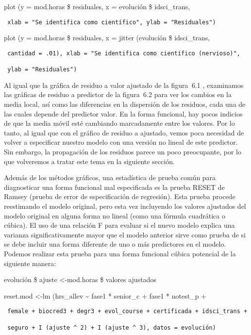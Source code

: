 \documentclass[
]{book}
\begin{document}
plot (y = mod.horas \$ residuales, x = evolución \$ idsci\_trans,

\begin{verbatim}
 xlab = "Se identifica como científico", ylab = "Residuales")
\end{verbatim}

plot (y = mod.horas \$ residuales, x = jitter (evolución \$ idsci\_trans,

\begin{verbatim}
 cantidad = .01), xlab = "Se identifica como científico (nervioso)",

 ylab = "Residuales")
\end{verbatim}

Al igual que la gráfica de residuo a valor ajustado de la figura  6.1 , examinamos las gráficas de residuo a predictor de la figura  6.2 para ver los cambios en la media local, así como las diferencias en la dispersión de los residuos, cada una de las cuales depende del predictor valor. En la forma funcional, hay pocos indicios de que la media móvil esté cambiando marcadamente entre los valores. Por lo tanto, al igual que con el gráfico de residuo a ajustado, vemos poca necesidad de volver a especificar nuestro modelo con una versión no lineal de este predictor. Sin embargo, la propagación de los residuos parece un poco preocupante, por lo que volveremos a tratar este tema en la siguiente sección.

Además de los métodos gráficos, una estadística de prueba común para diagnosticar una forma funcional mal especificada es la prueba RESET de Ramsey (prueba de error de especificación de regresión). Esta prueba procede reestimando el modelo original, pero esta vez incluyendo los valores ajustados del modelo original en alguna forma no lineal (como una fórmula cuadrática o cúbica). El uso de una relación F para evaluar si el nuevo modelo explica una varianza significativamente mayor que el modelo anterior sirve como prueba de si se debe incluir una forma diferente de uno o más predictores en el modelo. Podemos realizar esta prueba para una forma funcional cúbica potencial de la siguiente manera:

evolución \$ ajuste \textless-mod.horas \$ valores ajustados

reset.mod \textless-lm (hrs\_allev \textasciitilde{} fase1 * senior\_c + fase1 * notest\_p +

\begin{verbatim}
 female + biocred3 + degr3 + evol_course + certificada + idsci_trans +

 seguro + I (ajuste ^ 2) + I (ajuste ^ 3), datos = evolución)
\end{verbatim}
\end{document}
